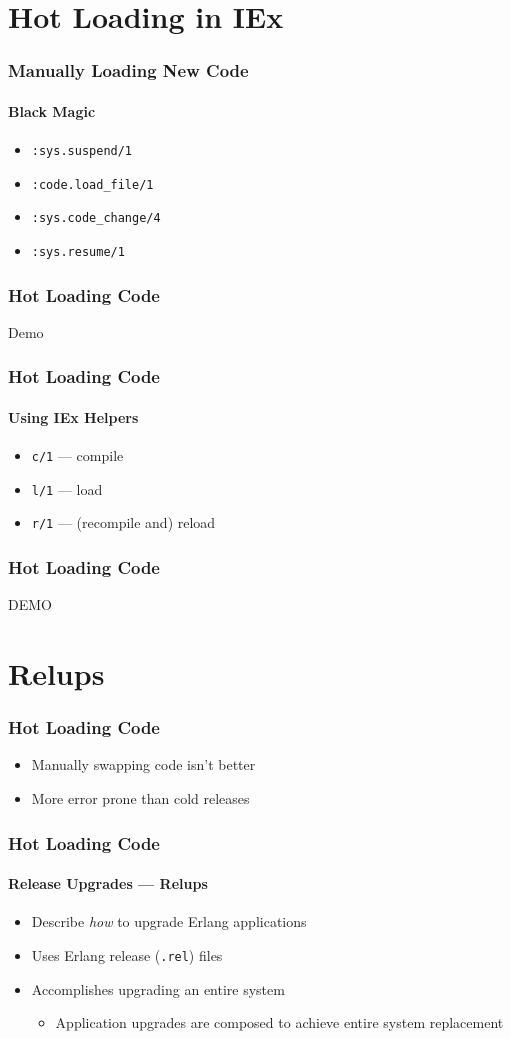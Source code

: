 \documentclass{beamer}
\begin{document}
\section{Hot Loading in IEx}

\begin{frame}
\frametitle{Manually Loading New Code}
\framesubtitle{Black Magic}
\begin{itemize}
\item{\texttt{:sys.suspend/1}}
\item{\texttt{:code.load\_file/1}}
\item{\texttt{:sys.code\_change/4}}
\item{\texttt{:sys.resume/1}}
\end{itemize}
\end{frame}

\begin{frame}
\frametitle{Hot Loading Code}
\Huge{Demo}
\end{frame}

\begin{frame}
\frametitle{Hot Loading Code}
\framesubtitle{Using IEx Helpers}
\begin{itemize}
\item{\texttt{c/1} --- compile}
\item{\texttt{l/1} --- load}
\item{\texttt{r/1} --- (recompile and) reload}
\end{itemize}
\end{frame}

\begin{frame}
\frametitle{Hot Loading Code}
\Huge{DEMO}
\end{frame}

\section{Relups}

\begin{frame}
\frametitle{Hot Loading Code}
\begin{itemize}
\item{Manually swapping code isn't better}
\item{More error prone than cold releases}
\end{itemize}
\end{frame}

\begin{frame}
\frametitle{Hot Loading Code}
\framesubtitle{Release Upgrades --- Relups}
\begin{itemize}
\item{Describe \textit{how} to upgrade Erlang applications}
\item{Uses Erlang release (\texttt{.rel}) files}
\item{Accomplishes upgrading an entire system}
\begin{itemize}
\item{Application upgrades are composed to achieve entire system replacement}
\end{itemize}
\end{itemize}
\end{frame}
\end{document}
